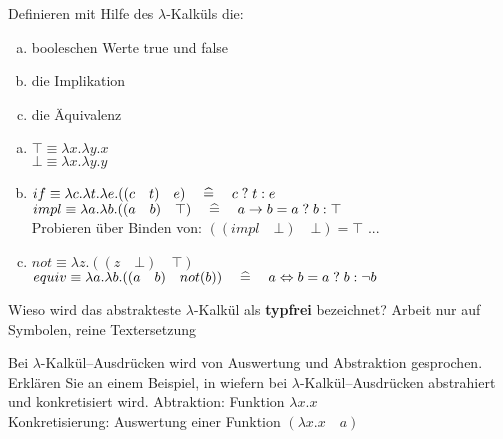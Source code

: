 \begin{card}
	Definieren mit Hilfe des $\lambda$-Kalküls die:
	\begin{enumerate}[a)]
    \item booleschen Werte true und false
    \item die Implikation
    \item die Äquivalenz
	\end{enumerate}
	\hr
	\begin{enumerate}[a)]
    \item $\top \equiv \lambda x.\lambda y . x$\\
        $\bot \equiv \lambda x.\lambda y . y$
    \item $if \equiv \lambda c.\lambda t.\lambda e.((c \quad t) \quad e) \quad \mathrel{\widehat{=}} \quad c \; ? \; t : e$ \\
        $impl \equiv \lambda a.\lambda b.((a \quad b) \quad \top) \quad \mathrel{\widehat{=}} \quad a \rightarrow b = a \; ? \; b : \top$ \\
        Probieren über Binden von: $((impl \quad \bot) \quad \bot) = \top$ ...
    \item	$not \equiv \lambda z.((z \quad \bot) \quad \top)$\\
        $equiv \equiv  \lambda a.\lambda b.((a \quad b) \quad not(b)) \quad \mathrel{\widehat{=}} \quad a \Leftrightarrow b = a \; ? \; b : \neg b$
	\end{enumerate}
\end{card}

\begin{card}
	Wieso wird das abstrakteste $\lambda$-Kalkül als \textbf{typfrei} bezeichnet?
	\hr
	Arbeit nur auf Symbolen, reine Textersetzung
\end{card}

\begin{card}
  Bei $\lambda$-Kalkül--Ausdrücken wird von Auswertung und Abstraktion gesprochen. Erklären Sie an einem Beispiel, in wiefern bei $\lambda$-Kalkül--Ausdrücken abstrahiert und konkretisiert wird.
  \hr
  Abtraktion: Funktion $\lambda x.x$\\
  Konkretisierung: Auswertung einer Funktion $(\lambda x.x \quad a)$
\end{card}

